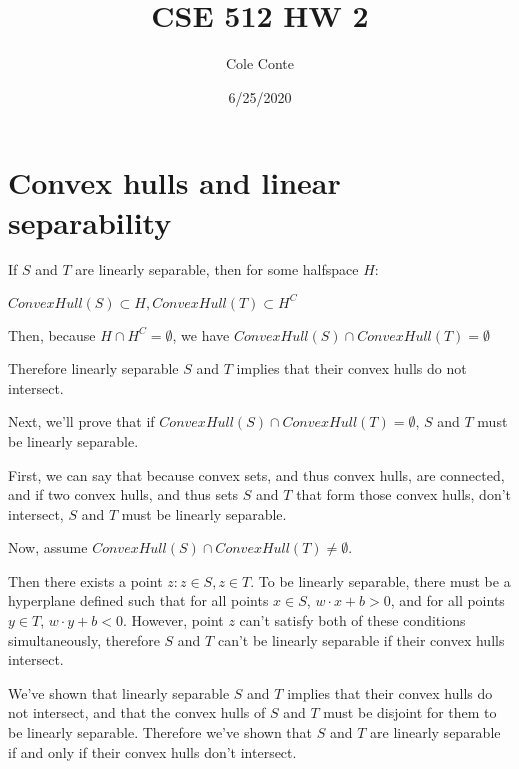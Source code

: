 \documentclass{article}
\begin{document}
\title{CSE 512 HW 2}
\author{Cole Conte}
\date{6/25/2020}

\maketitle

\pagebreak
\section{Convex hulls and linear separability}
If \(S\) and \(T\) are linearly separable, then for some halfspace \(H\):

\(ConvexHull(S) \subset H, ConvexHull(T) \subset H^C \)
 
Then, because \( H \cap H^C = \emptyset \), we have  \( ConvexHull(S) \cap ConvexHull(T) = \emptyset \)
 
Therefore linearly separable \(S\) and \(T\) implies that their convex hulls do not intersect.
\linebreak



Next, we'll prove that if  \( ConvexHull(S) \cap ConvexHull(T) = \emptyset \), \(S\) and \(T\) must be linearly separable.

First, we can say that because convex sets, and thus convex hulls, are connected, and if two convex hulls, and thus sets \(S\) and \(T\) that form those convex hulls, don't intersect, \(S\) and \(T\) must be linearly separable.

Now, assume \( ConvexHull(S) \cap ConvexHull(T) \ne \emptyset \). 

Then there exists a point \(z: z \in S, z \in T\). To be linearly separable, there must be a hyperplane defined such that for all points \(x \in S\), 
 \(w \cdot x + b > 0\), and for all points \(y \in T\),  \(w \cdot y + b < 0\). However, point \(z\) can't satisfy both of these conditions simultaneously, therefore \(S\) and \(T\) can't be linearly separable if their convex hulls intersect.

We've shown that linearly separable \(S\) and \(T\) implies that their convex hulls do not intersect, and that the convex hulls of \(S\) and \(T\) must be disjoint for them to be linearly separable.
Therefore we've shown that \(S\) and \(T\) are linearly separable if and only if their convex hulls don't intersect.
\end{document}
